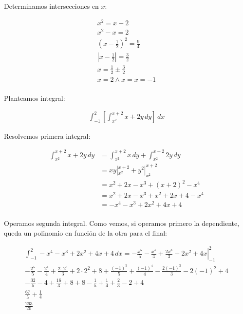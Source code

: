 Determinamos intersecciones en \(x\):

\begin{align*}
    x^{2} = x + 2 \\
    x^{2} - x = 2 \\
    (x-\frac{1}{2})^{2} = \frac{9}{4} \\
    |x-\frac{1}{2}| = \frac{3}{2} \\
    x = \frac{1}{2} \pm \frac{3}{2} \\ 
    x = 2 \land x = x = -1 \\
\end{align*}

Planteamos integral:

\begin{align*}
    \int_{-1}^{2} [\int_{x^{2}}^{x+2} x + 2y \,dy] \,dx
\end{align*}

Resolvemos primera integral:

\begin{align*}
    \int_{x^{2}}^{x+2} x + 2y \,dy & = \int_{x^{2}}^{x+2} x \,dy + \int_{x^{2}}^{x+2} 2y \,dy \\
    & = xy|_{x^{2}}^{x+2} + y^{2}|_{x^{2}}^{x+2} \\
    & = x^{2} + 2x - x^{3} + (x+2)^{2} - x^{4} \\
    & = x^{2} + 2x - x^{3} + x^{2} + 2x + 4 - x^{4} \\
    & = -x^{4} - x^{3} + 2x^{2} + 4x + 4 \\
\end{align*}

Operamos segunda integral.
Como vemos, si operamos primero la dependiente,
queda un polinomio en función de la otra para el final: 

\begin{gather*}
    \int_{-1}^{2} -x^{4} - x^{3} + 2x^{2} + 4x + 4 \,dx = \left.-\frac{x^{5}}{5} - \frac{x^{4}}{4} + \frac{2x^{3}}{3} + 2x^{2} + 4x\right|_{-1}^{2} \\
    -\frac{2^{5}}{5} - \frac{2^{4}}{4} + \frac{2\cdot2^{3}}{3} + 2\cdot2^{2} + 8 + \frac{(-1)^{5}}{5} + \frac{(-1)^{4}}{4} - \frac{2(-1)^{3}}{3} - 2(-1)^{2} + 4 \\
    -\frac{32}{5} - 4 + \frac{16}{3} + 8 + 8 - \frac{1}{5} + \frac{1}{4} + \frac{2}{3} - 2 + 4 \\
    \frac{67}{5} + \frac{1}{4} \\
    \boxed{\frac{263}{20}} \\
\end{gather*}